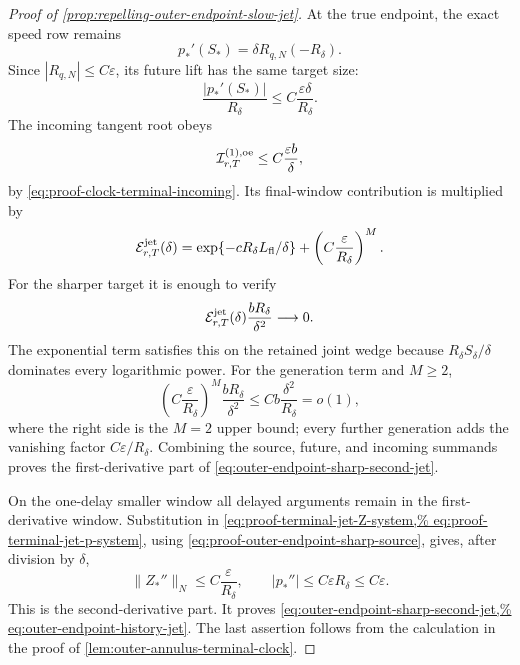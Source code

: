 \begin{proof}[Proof of
\cref{prop:repelling-outer-endpoint-slow-jet}]
At the true endpoint, the exact speed row remains
\[
 p_*'(S_*)=\delta R_{q,N}(-R_\delta).
\]
Since \(|R_{q,N}|\le C\varepsilon\), its future lift has the same target
size:
\begin{equation}
 \frac{|p_*'(S_*)|}{R_\delta}
 \le C\frac{\varepsilon\delta}{R_\delta}.       \label{eq:proof-outer-endpoint-future-output}
\end{equation}
The incoming tangent root obeys
\begin{equation}
 \mathcal I_{r,T}^{(1),\rm oe}
 \le C\frac{\varepsilon b}{\delta},             \label{eq:proof-outer-endpoint-incoming}
\end{equation}
by \cref{eq:proof-clock-terminal-incoming}.
Its final-window contribution is multiplied by
\[
 \mathcal E_{r,T}^{\rm jet}(\delta)
 =\exp\{-cR_\delta L_{\rm fl}/\delta\}
  +\left(C\frac{\varepsilon}{R_\delta}\right)^M.
\]
For the sharper target it is enough to verify
\begin{equation}
 \mathcal E_{r,T}^{\rm jet}(\delta)
       \frac{bR_\delta}{\delta^2}\longrightarrow0.          \label{eq:proof-outer-endpoint-sharp-final-scale}
\end{equation}
The exponential term satisfies this on the retained joint wedge because
\(R_\delta S_\delta/\delta\) dominates every logarithmic power.  For the
generation term and \(M\ge2\),
\[
 \left(C\frac{\varepsilon}{R_\delta}\right)^M
       \frac{bR_\delta}{\delta^2}
 \le Cb\frac{\delta^2}{R_\delta}=o(1),
\]
where the right side is the \(M=2\) upper bound; every further generation
adds the vanishing factor \(C\varepsilon/R_\delta\).
Combining the source, future, and incoming summands proves the
first-derivative part of
\cref{eq:outer-endpoint-sharp-second-jet}.

On the one-delay smaller window all delayed arguments remain in the
first-derivative window.  Substitution in
\cref{eq:proof-terminal-jet-Z-system,%
eq:proof-terminal-jet-p-system}, using
\cref{eq:proof-outer-endpoint-sharp-source}, gives, after division by
\(\delta\),
\[
 \|Z_*''\|_N\le C\frac{\varepsilon}{R_\delta},
 \qquad
 |p_*''|\le C\varepsilon R_\delta\le C\varepsilon.
\]
This is the second-derivative part.  It proves
\cref{eq:outer-endpoint-sharp-second-jet,%
eq:outer-endpoint-history-jet}.  The last assertion follows from the
calculation in the proof of
\cref{lem:outer-annulus-terminal-clock}.
\end{proof}

